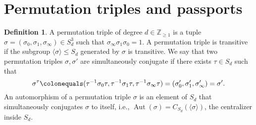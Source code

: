 \documentclass{dcthesis}
\newcommand{\PP}{\mathbb P}
\newcommand{\CC}{\mathbb C}
\newcommand{\QQ}{\mathbb Q}
\newcommand{\ZZ}{\mathbb Z}
\newcommand{\defi}[1]{\textsf{#1}}
\DeclareMathOperator{\Aut}{Aut}
\DeclareMathOperator{\Mon}{Mon}
\DeclareMathOperator{\Gal}{Gal}
\numberwithin{equation}{section}
\theoremstyle{definition}
\newtheorem{definition}[equation]{Definition}
\theoremstyle{remark}
\begin{document}
{{  \section{Permutation triples and passports}{\label{sec:passports}
    \begin{definition}
      \label{def:permutationtriple}
      A \defi{permutation triple} of degree
      $d \in \ZZ_{\geq 1}$ is a tuple
      $\sigma =
      (\sigma_0,\sigma_1,\sigma_\infty)\in S_d^3$
      such that
      $\sigma_\infty \sigma_1 \sigma_0 = 1$.
      A permutation triple is
      \defi{transitive} if the subgroup
      $\langle \sigma \rangle \leq S_d$
      generated by $\sigma$ is transitive.
      We say
      that two permutation triples
      $\sigma,\sigma'$ are
      \defi{simultaneously conjugate}
      if there exists $\tau\in S_d$ such that
      \begin{equation}\label{eqn:simconj}
        \sigma^\tau \colonequals
        (\tau^{-1}\sigma_0\tau, \tau^{-1}\sigma_1\tau, \tau^{-1}\sigma_\infty\tau)
        = \left(\sigma'_0,\sigma'_1,\sigma'_\infty\right)
        = \sigma'.
      \end{equation}
      An \defi{automorphism} of
      a permutation triple $\sigma$
      is an element of $S_d$ that
      simultaneously conjugates
      $\sigma$ to itself, i.e.,
      $\Aut(\sigma)=
      C_{S_d}(\langle \sigma \rangle)$,
      the centralizer inside $S_d$.

\end{definition}}}}
\end{document}
